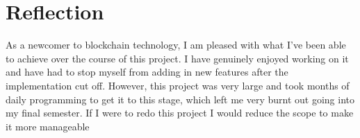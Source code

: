 \section{Reflection}

As a newcomer to blockchain technology, I am pleased with what I've been able to achieve over the course of this project. I have genuinely enjoyed working on it and have had to stop myself from adding in new features after the implementation cut off.
\x
However, this project was very large and took months of daily programming to get it to this stage, which left me very burnt out going into my final semester. If I were to redo this project I would reduce the scope to make it more manageable 